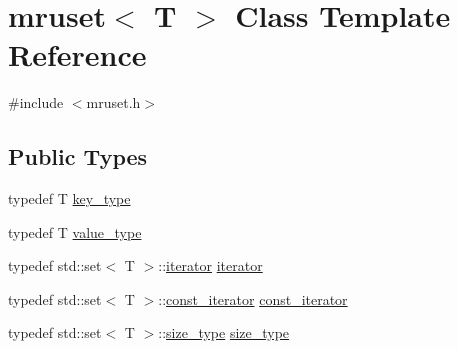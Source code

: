 \hypertarget{classmruset}{}\section{mruset$<$ T $>$ Class Template Reference}
\label{classmruset}


{\ttfamily \#include $<$mruset.\+h$>$}

\subsection*{Public Types}
\begin{DoxyCompactItemize}
\item 
typedef T \hyperlink{classmruset_a282941ee7f0438b0c09274b10c78cda0}{key\+\_\+type}
\item 
typedef T \hyperlink{classmruset_a834c3e7f8e9cf615ebe27752443f9a3a}{value\+\_\+type}
\item 
typedef std\+::set$<$ T $>$\+::\hyperlink{classmruset_a246172eda1afff45be47a013c14b1ad6}{iterator} \hyperlink{classmruset_a246172eda1afff45be47a013c14b1ad6}{iterator}
\item 
typedef std\+::set$<$ T $>$\+::\hyperlink{classmruset_a74c77f7642e8e4db7cc79991c4345692}{const\+\_\+iterator} \hyperlink{classmruset_a74c77f7642e8e4db7cc79991c4345692}{const\+\_\+iterator}
\item 
typedef std\+::set$<$ T $>$\+::\hyperlink{classmruset_aaee46af18d8a5bdc503e9570e499a335}{size\+\_\+type} \hyperlink{classmruset_aaee46af18d8a5bdc503e9570e499a335}{size\+\_\+type}
\end{DoxyCompactItemize}
